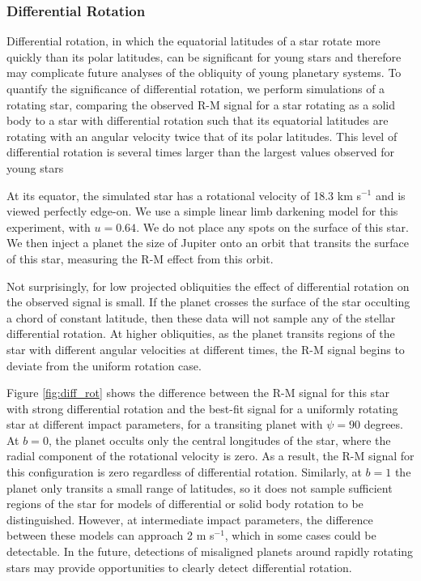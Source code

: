 \documentclass[twocolumn]{aastex63}
\begin{document}
\subsubsection{Differential Rotation}



Differential rotation, in which the equatorial latitudes of a star rotate more quickly than its polar latitudes, can be significant for young stars \citep{Waite17} and therefore may complicate future analyses of the obliquity of young planetary systems.
To quantify the significance of differential rotation, we perform simulations of a rotating star, comparing the observed R-M signal for a star rotating as a solid body to a star with differential rotation such that its equatorial latitudes are rotating with an angular velocity twice that of its polar latitudes. This level of differential rotation is several times larger than the largest values observed for young stars \citep[e.g.][]{Frohlich12}

At its equator, the simulated star has a rotational velocity of 18.3 km s$^{-1}$ and is viewed perfectly edge-on.
We use a simple linear limb darkening model for this experiment, with $u = 0.64$. 
We do not place any spots on the surface of this star.
We then inject a planet the size of Jupiter onto an orbit that transits the surface of this star, measuring the R-M effect from this orbit.

Not surprisingly, for low projected obliquities the effect of differential rotation on the observed signal is small. If the planet crosses the surface of the star occulting a chord of constant latitude, then these data will not sample any of the stellar differential rotation. 
At higher obliquities, as the planet transits regions of the star with different angular velocities at different times, the R-M signal begins to deviate from the uniform rotation case.

Figure \ref{fig:diff_rot} shows the difference between the R-M signal for this star with strong differential rotation and the best-fit signal for a uniformly rotating star at different impact parameters, for a transiting planet with $\psi = 90$ degrees.
At $b=0$, the planet occults only the central longitudes of the star, where the radial component of the rotational velocity is zero. As a result, the R-M signal for this configuration is zero regardless of differential rotation.
Similarly, at $b=1$ the planet only transits a small range of latitudes, so it does not sample sufficient regions of the star for models of differential or solid body rotation to be distinguished.
However, at intermediate impact parameters, the difference between these models can approach 2 m s$^{-1}$, which in some cases could be detectable. 
In the future, detections of misaligned planets around rapidly rotating stars may provide opportunities to clearly detect differential rotation.
\end{document}
